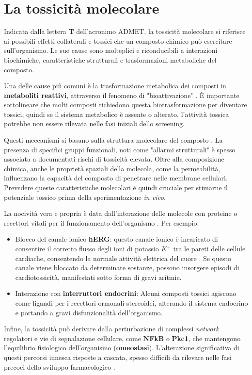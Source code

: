\section{La tossicità molecolare}
Indicata dalla lettera \textbf{T} dell'acronimo ADMET, la tossicità molecolare si riferisce ai possibili effetti collaterali e tossici che un composto chimico può esercitare sull'organismo.
Le sue cause sono 
molteplici e riconducibili a interazioni biochimiche, caratteristiche 
strutturali e trasformazioni metaboliche del composto.

Una delle cause più comuni è la trasformazione metabolica dei composti in \textbf{metaboliti reattivi}, attraverso il fenomeno di "bioattivazione" \cite{houckUnderstandingMechanismsToxicity2008}.
È importante sottolineare che molti composti richiedono questa 
biotrasformazione per diventare tossici, quindi se il sistema metabolico è 
assente o alterato, l'attività tossica potrebbe non essere rilevata nelle 
fasi iniziali dello screening.

Questi meccanismi si basano sulla struttura molecolare del composto \cite{liEnhancingADMETProperty2026a}.
La presenza di specifici gruppi funzionali, noti come "allarmi strutturali" è spesso associata a documentati rischi di tossicità elevata.
Oltre alla composizione chimica, anche le proprietà spaziali della molecola, come la permeabilità, influenzano la capacità del composto di penetrare nelle membrane cellulari\cite{liEnhancingADMETProperty2026a}.
Prevedere queste caratteristiche molecolari è 
quindi cruciale per stimarne il potenziale tossico prima della 
sperimentazione \textit{in vivo}.

La nocività vera e propria è data dall'interazione delle molecole con proteine o recettori vitali per il funzionamento dell'organismo \cite{houckUnderstandingMechanismsToxicity2008}. Per esempio:
\begin{itemize}
    \item Blocco del canale ionico \textbf{hERG}: questo canale ionico è incaricato di consentire il corretto flusso degli ioni di potassio $K^{+}$ tra le pareti delle cellule cardiache, consentendo la normale attività elettrica del cuore \cite{houckUnderstandingMechanismsToxicity2008}. Se questo canale viene bloccato da determinate sostanze, possono insorgere episodi di cardiotossicità, manifestati sotto forma di gravi aritmie.
    \item Interazione con \textbf{interruttori endocrini}: Alcuni composti tossici agiscono come ligandi per i recettori ormonali stereoidei, alterando il sistema endocrino e portando a gravi disfunzionalità dell'organismo.
\end{itemize}
Infine, la tossicità può derivare dalla perturbazione di complessi 
\textit{network} regolatori e vie di segnalazione cellulare, come 
\textbf{NFkB} o \textbf{Pkc1}, che mantengono l'equilibrio fisiologico 
dell'organismo (\textbf{omeostasi}). L'alterazione significativa di 
questi percorsi innesca risposte a cascata, spesso difficili 
da rilevare nelle fasi precoci dello sviluppo farmacologico \cite{houckUnderstandingMechanismsToxicity2008}.

